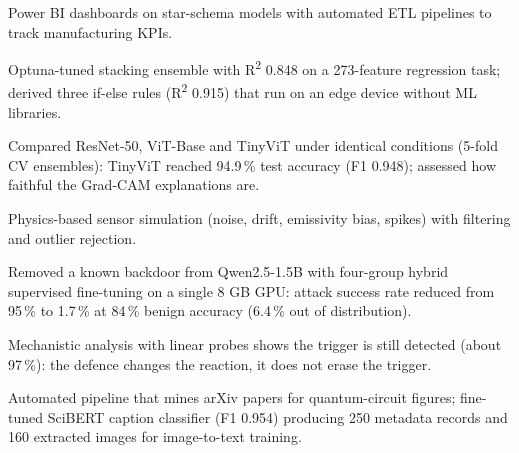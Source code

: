 \documentclass[a4paper,10pt]{article}
\begin{document}
  \cvpointsstart
    \item Power BI dashboards on star-schema models with automated ETL pipelines to track manufacturing KPIs.
  \cvpointsend

  \cvpointsstart
    \item Optuna-tuned stacking ensemble with R\textsuperscript{2} 0.848 on a 273-feature regression task; derived
          three if-else rules (R\textsuperscript{2} 0.915) that run on an edge device without ML libraries.
  \cvpointsend

  \cvpointsstart
    \item Compared ResNet-50, ViT-Base and TinyViT under identical conditions (5-fold CV ensembles): TinyViT reached
          94.9\,\% test accuracy (F1 0.948); assessed how faithful the Grad-CAM explanations are.
  \cvpointsend

  \cvpointsstart
    \item Physics-based sensor simulation (noise, drift, emissivity bias, spikes) with filtering and outlier rejection.
  \cvpointsend


  \cvpointsstart
    \item Removed a known backdoor from Qwen2.5-1.5B with four-group hybrid supervised fine-tuning on a single 8 GB
          GPU: attack success rate reduced from 95\,\% to 1.7\,\% at 84\,\% benign accuracy (6.4\,\% out of distribution).
    \item Mechanistic analysis with linear probes shows the trigger is still detected (about 97\,\%): the defence
          changes the reaction, it does not erase the trigger.
  \cvpointsend

  \cvpointsstart
    \item Automated pipeline that mines arXiv papers for quantum-circuit figures; fine-tuned SciBERT caption
          classifier (F1 0.954) producing 250 metadata records and 160 extracted images for image-to-text training.
  \cvpointsend
\end{document}
